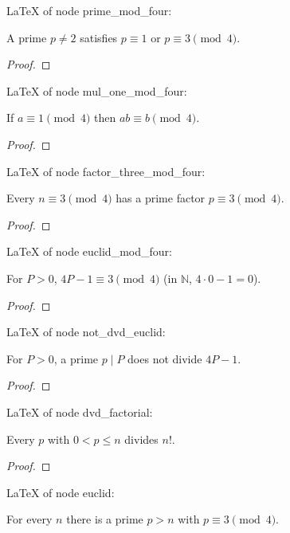 LaTeX of node prime_mod_four:
\begin{theorem}
\label{prime_mod_four}
\leanok
A prime $p \neq 2$ satisfies $p \equiv 1$ or $p \equiv 3 \pmod 4$.
\end{theorem}
\begin{proof}
\leanok
\end{proof}
LaTeX of node mul_one_mod_four:
\begin{theorem}
\label{mul_one_mod_four}
\leanok
If $a \equiv 1 \pmod 4$ then $ab \equiv b \pmod 4$.
\end{theorem}
\begin{proof}
\leanok
\end{proof}
LaTeX of node factor_three_mod_four:
\begin{theorem}
\label{factor_three_mod_four}
\leanok
Every $n \equiv 3 \pmod 4$ has a prime factor $p \equiv 3 \pmod 4$.
\end{theorem}
\begin{proof}
\leanok
\end{proof}
LaTeX of node euclid_mod_four:
\begin{theorem}
\label{euclid_mod_four}
\leanok
For $P > 0$, $4P - 1 \equiv 3 \pmod 4$ (in $\mathbb{N}$, $4 \cdot 0 - 1 = 0$).
\end{theorem}
\begin{proof}
\leanok
\end{proof}
LaTeX of node not_dvd_euclid:
\begin{theorem}
\label{not_dvd_euclid}
\leanok
For $P > 0$, a prime $p \mid P$ does not divide $4P - 1$.
\end{theorem}
\begin{proof}
\leanok
\end{proof}
LaTeX of node dvd_factorial:
\begin{theorem}
\label{dvd_factorial}
\leanok
Every $p$ with $0 < p \le n$ divides $n!$.
\end{theorem}
\begin{proof}
\leanok
\end{proof}
LaTeX of node euclid:
\begin{theorem}
\label{euclid}
\leanok
For every $n$ there is a prime $p > n$ with $p \equiv 3 \pmod 4$.
\end{theorem}
